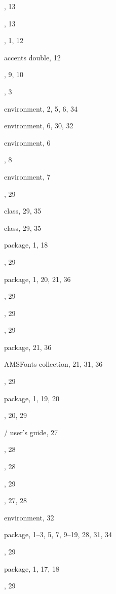 \documentclass[leqno,titlepage,openany]{amsldoc}
\begin{document}
\begin{theindex}
  \item {}, 13
  \item {}, 13
  \item {}, 1, 12
  \item accents
    \subitem double, 12
  \item {}, 9, 10
  \item {}, 3
  \item {} environment, 2, 5, 6, 34
  \item {} environment, 6, 30, 32
  \item {} environment, 6
  \item {}, 8
  \item {} environment, 7
  \item {}, 29
  \item {} class, 29, 35
  \item {} class, 29, 35
  \item {} package, 1, 18
  \item {}, 29
  \item {} package, 1, 20, 21, 36
  \item {}, 29
  \item {}, 29
  \item {}, 29
  \item {} package, 21, 36
  \item AMSFonts collection, 21, 31, 36
  \item {}, 29
  \item {} package, 1, 19, 20
  \item {}, 20, 29
  \item \amslatex/ user's guide, 27
  \item {}, 28
  \item {}, 28
  \item {}, 29
  \item {}, 27, 28
  \item {} environment, 32
  \item {} package, 1--3, 5, 7, 9--19, 28, 31, 34
  \item {}, 29
  \item {} package, 1, 17, 18
  \item {}, 29

\end{theindex}
\end{document}
